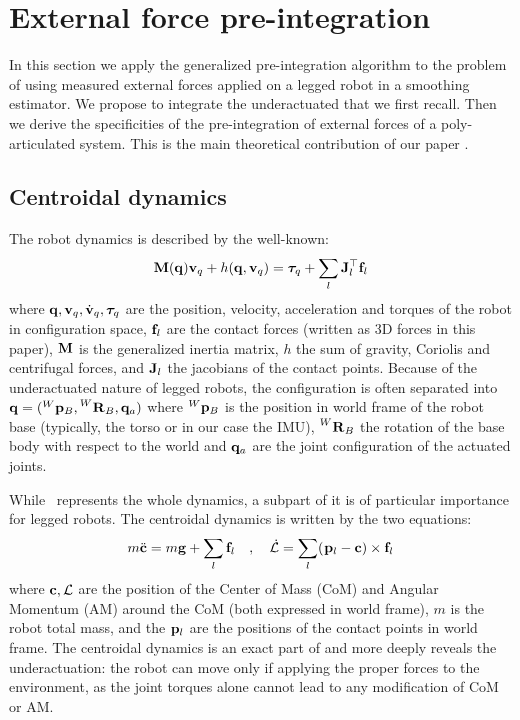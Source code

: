 \section{External force pre-integration}
In this section we apply the generalized pre-integration algorithm to the problem of using measured external
forces applied on a legged robot in a smoothing estimator. We propose to integrate the underactuated that we first recall. Then 
we derive the specificities of the pre-integration of external forces of a poly-articulated system. This is the main theoretical contribution
of our paper \cite{fourmy2021contact}.


\subsection{Centroidal dynamics}
\label{sec:centroidal_dynamics}
The robot dynamics is described by the well-known:
%
\begin{equation}\label{eq:wbdyn}
  {\bf M}({\bf q}) {\bf v}_q + h({\bf q},{\bf v}_q) = \bm\tau_q + \sum_l {\bf J}_l^{\top} {\bf f}_l
\end{equation}
%
where ${\bf q},{\bf v}_q,\dot{{\bf v}}_q,\bm\tau_q$ are the position, velocity, acceleration and torques of the robot in configuration space,
${\bf f}_l$ are the contact forces (written as 3D forces in this paper),
${\bf M}$ is the generalized inertia matrix, $h$ the sum of gravity, Coriolis and centrifugal forces, and ${\bf J}_l$ the jacobians of the contact points.
Because of the underactuated nature of legged robots, the configuration is often separated into ${\bf q}=(\prescript{W}{}{{\bf p}}_{B},\prescript{W}{}{{\bf R}}_{B},{\bf q}_a)$ where $\prescript{W}{}{{\bf p}}_{B}$ 
is the position in world frame of the robot base (typically, the torso or in our case the IMU), $\prescript{W}{}{{\bf R}}_{B}$ the rotation of the base body with respect 
to the world and ${\bf q}_a$ are the joint configuration of the actuated joints. 

While~ represents the whole dynamics, a subpart of it is of particular importance for legged robots.
The centroidal dynamics is written by the two equations:
%
\begin{equation}
    m \ddot{{\bf c}} = m {\bf g} + \sum_l {\bf f}_l \quad , \quad
\mathcal{\dot{L}} = \sum_l (\prescript{}{}{{\bf p}}_{l} - {\bf c}) \times {\bf f}_l
\label{eq:NewtonEuler}
\end{equation}
%
where ${\bf c},\mathcal{L}$ are the position of the Center of Mass (CoM) and Angular Momentum (AM) around the CoM (both expressed in world frame), $m$ is the robot total mass, 
and the $\prescript{}{}{{\bf p}}_{l}$ are the positions of the contact points in world frame. The centroidal dynamics is an exact part of  and more deeply reveals 
the underactuation: the robot can move only if applying the proper forces to the environment, as the joint torques alone cannot lead to any modification 
of CoM or AM.


